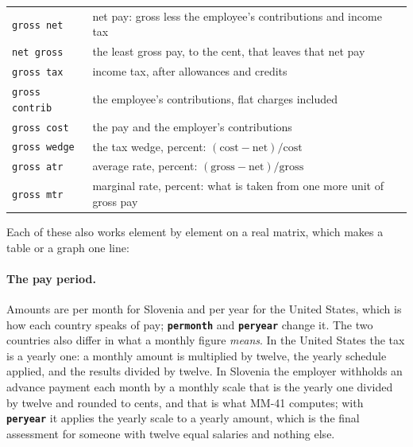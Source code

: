 \documentclass[11pt,letterpaper]{article}
\newcommand{\code}[1]{\texttt{#1}}
\newcommand{\cmd}[1]{\texttt{\textbf{#1}}}
\begin{document}
\begin{center}
\begin{tabular}{@{}ll@{}}
\toprule
\code{gross net} & net pay: gross less the employee's contributions and income tax\\
\code{net gross} & the least gross pay, to the cent, that leaves that net pay\\
\code{gross tax} & income tax, after allowances and credits\\
\code{gross contrib} & the employee's contributions, flat charges included\\
\code{gross cost} & the pay and the employer's contributions\\
\code{gross wedge} & the tax wedge, percent: $(\mathrm{cost}-\mathrm{net})/\mathrm{cost}$\\
\code{gross atr} & average rate, percent: $(\mathrm{gross}-\mathrm{net})/\mathrm{gross}$\\
\code{gross mtr} & marginal rate, percent: what is taken from one more unit of gross pay\\
\bottomrule
\end{tabular}
\end{center}
Each of these also works element by element on a real matrix, which makes a table or a graph one line:

\paragraph{The pay period.} Amounts are per month for Slovenia and per year for the United States, which is how each country speaks of pay; \cmd{permonth} and \cmd{peryear} change it. The two countries also differ in what a monthly figure \emph{means}. In the United States the tax is a yearly one: a monthly amount is multiplied by twelve, the yearly schedule applied, and the results divided by twelve. In Slovenia the employer withholds an advance payment each month by a monthly scale that is the yearly one divided by twelve and rounded to cents, and that is what MM-41 computes; with \cmd{peryear} it applies the yearly scale to a yearly amount, which is the final assessment for someone with twelve equal salaries and nothing else.
\end{document}
